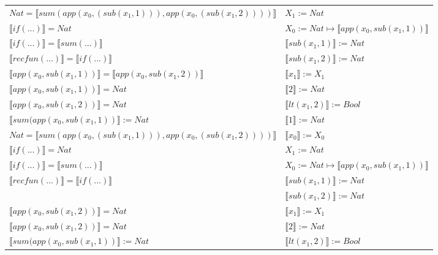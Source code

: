 \begin{exercise}
\begin{description}
\begin{center}
\begin{longtable}{ | l | l | }
                        $Nat =  \llbracket sum(app(x_0, (sub(x_1,1))), app(x_0, (sub(x_1,2)))) \rrbracket$ & $X_1 := Nat$\\
                        $ \llbracket if(...) \rrbracket = Nat$ & $X_0 := Nat \mapsto  \llbracket app(x_0, sub(x_1,1)) \rrbracket$\\
                        $ \llbracket if(...) \rrbracket =  \llbracket sum(...) \rrbracket$ & $ \llbracket sub(x_1,1) \rrbracket := Nat$\\
                        $ \llbracket recfun(...) \rrbracket =  \llbracket if(...) \rrbracket$ & $ \llbracket sub(x_1,2) \rrbracket := Nat$ \\
                    \hline
			     $ \llbracket app(x_0, sub(x_1,1)) \rrbracket =  \llbracket app(x_0, sub(x_1,2)) \rrbracket$ &   $ \llbracket x_1 \rrbracket := X_1$\\ 
                        $ \llbracket app(x_0, sub(x_1,1)) \rrbracket = Nat$ & $ \llbracket 2 \rrbracket := Nat$\\ 
                        $ \llbracket app(x_0, sub(x_1,2)) \rrbracket = Nat$ & $ \llbracket lt(x_1 , 2) \rrbracket := Bool$\\
                        $ \llbracket sum(app(x_0, sub(x_1,1)) \rrbracket := Nat$ &    $ \llbracket 1 \rrbracket := Nat$\\ 
                        $Nat =  \llbracket sum(app(x_0, (sub(x_1,1))), app(x_0, (sub(x_1,2)))) \rrbracket$ &  $ \llbracket x_0 \rrbracket := X_0$\\
                        $ \llbracket if(...) \rrbracket = Nat$ &  $X_1 := Nat$\\ 
                        $ \llbracket if(...) \rrbracket =  \llbracket sum(...) \rrbracket$ &  $X_0 := Nat \mapsto  \llbracket app(x_0, sub(x_1,1)) \rrbracket$\\ 
                        $ \llbracket recfun(...) \rrbracket =  \llbracket if(...) \rrbracket$ &  $ \llbracket sub(x_1,1) \rrbracket := Nat$\\ 
                        & $ \llbracket sub(x_1,2) \rrbracket := Nat$ \\
                    \hline
                        $ \llbracket app(x_0, sub(x_1,2)) \rrbracket = Nat$ &  $ \llbracket x_1 \rrbracket := X_1$\\
                        $ \llbracket app(x_0, sub(x_1,2)) \rrbracket = Nat$ &   $ \llbracket 2 \rrbracket := Nat$\\  
                        $ \llbracket sum(app(x_0, sub(x_1,1)) \rrbracket := Nat$ & $ \llbracket lt(x_1 , 2) \rrbracket := Bool$\\ 

\end{longtable}
\end{center}
\end{description}
\end{exercise}
